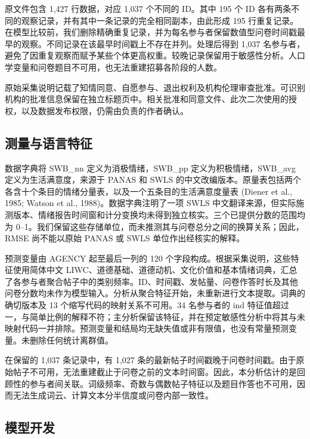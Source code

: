 \documentclass[11pt,letterpaper]{article}
\begin{document}
原文件包含 1,427 行数据，对应 1,037 个不同的 ID。其中 195 个 ID 各有两条不同的观察记录，并有其中一条记录的完全相同副本，由此形成 195 行重复记录。在模型比较前，我们删除精确重复记录，并为每名参与者保留数值型问卷时间戳最早的观察。不同记录在该最早时间戳上不存在并列。处理后得到 1,037 名参与者，避免了因重复观察而赋予某些个体更高权重。较晚记录保留用于敏感性分析。人口学变量和问卷题目不可用，也无法重建招募各阶段的人数。

原始采集说明记载了知情同意、自愿参与、退出权利及机构伦理审查批准。可识别机构的批准信息保留在独立标题页中。相关批准和同意文件、此次二次使用的授权，以及数据发布权限，仍需由负责的作者确认。

\subsection{测量与语言特征}\label{ux6d4bux91cfux4e0eux8bedux8a00ux7279ux5f81}

数据字典将 SWB\_\allowbreak{}nn 定义为消极情绪，SWB\_\allowbreak{}pp 定义为积极情绪，SWB\_\allowbreak{}avg 定义为生活满意度，来源于 PANAS 和 SWLS 的中文改编版本。原量表包括两个各含十个条目的情绪分量表，以及一个五条目的生活满意度量表 (Diener et al., 1985; Watson et al., 1988)。数据字典注明了一项 SWLS 中文翻译来源，但实际施测版本、情绪报告时间窗和计分变换均未得到独立核实。三个已提供分数的范围均为 0--1。我们保留这些存储单位，而未推测其与问卷总分之间的换算关系；因此，RMSE 尚不能以原始 PANAS 或 SWLS 单位作出经核实的解释。

预测变量由 AGENCY 起至最后一列的 120 个字段构成。根据采集说明，这些特征使用简体中文 LIWC、道德基础、道德动机、文化价值和基本情绪词典，汇总了各参与者聚合帖子中的类别频率。ID、时间戳、发帖量、问卷作答时长及其他问卷分数均未作为模型输入。分析从聚合特征开始，未重新进行文本提取。词典的确切版本及 13 个缩写代码的映射关系不可用。34 名参与者的 ind 特征值超过一，与简单比例的解释不符；主分析保留该特征，并在预定敏感性分析中将其与未映射代码一并排除。预测变量和结局均无缺失值或非有限值，也没有常量预测变量。未删除任何统计离群值。

在保留的 1,037 条记录中，有 1,027 条的最新帖子时间戳晚于问卷时间戳。由于原始帖子不可用，无法重建截止于问卷之前的文本时间窗。因此，本分析估计的是回顾性的参与者间关联。词级频率、奇数与偶数帖子特征以及题目作答也不可用，因而无法生成词云、计算文本分半信度或问卷内部一致性。

\subsection{模型开发}\label{ux6a21ux578bux5f00ux53d1}
\end{document}

